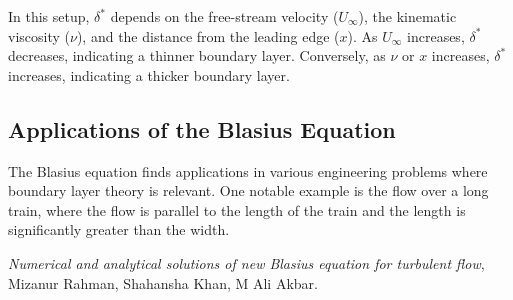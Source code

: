 \documentclass{article}
\begin{document}
In this setup, \(\delta^*\) depends on the free-stream velocity (\(U_\infty\)), the kinematic viscosity (\(\nu\)), and the distance from the leading edge (\(x\)). As \(U_\infty\) increases, \(\delta^*\) decreases, indicating a thinner boundary layer. Conversely, as \(\nu\) or \(x\) increases, \(\delta^*\) increases, indicating a thicker boundary layer.
\subsection{Applications of the Blasius Equation}
The Blasius equation finds applications in various engineering problems where boundary layer theory is relevant. One notable example is the flow over a long train, where the flow is parallel to the length of the train and the length is significantly greater than the width. 


\begin{thebibliography}{9}

  \textit{Numerical and analytical solutions of new Blasius equation for turbulent flow},
  Mizanur Rahman, Shahansha Khan, M Ali Akbar.
\end{thebibliography}
\end{document}
